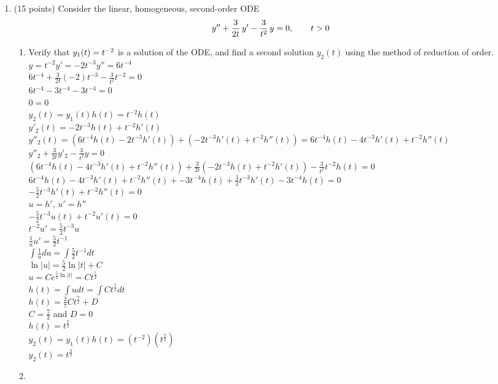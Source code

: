 \documentclass{article}
\begin{document}
\begin{enumerate}

\bigskip
\item (15 points) Consider the linear, homogeneous, second-order ODE
\[
y\sp{\prime\prime}+{3\over2t}\,y\sp\prime-{3\over t\sp2}\,y=0,\qquad t>0
\]
\begin{enumerate}
\item
Verify that $y_1(t)=t\sp{-2}$ is a solution of the ODE, and find a second solution $y_2(t)$ using the method of reduction of order.
\\$y=t^{-2}$\qquad$y'=-2t^{-3}$\qquad$y''=6t^{-4}$
\\$6t^{-4}+\frac{3}{2t}(-2)t^{-3}-\frac{3}{t^2}t^{-2}=0$
\\$6t^{-4}-3t^{-4}-3t^{-4}=0$
\\$0=0$
\\$y_2(t)=y_1(t)h(t)=t^{-2}h(t)$
\\$y'_2(t)=-2t^{-3}h(t)+t^{-2}h'(t)$
\\$y''_2(t)=(6t^{-4}h(t)-2t^{-3}h'(t))+(-2t^{-3}h'(t)+t^{-2}h''(t))=6t^{-4}h(t)-4t^{-3}h'(t)+t^{-2}h''(t)$
\\$y''_2+\frac{3}{2t}y'_2-\frac{3}{t^2}y=0$
\\$(6t^{-4}h(t)-4t^{-3}h'(t)+t^{-2}h''(t))+\frac{3}{2t}(-2t^{-3}h(t)+t^{-2}h'(t))-\frac{3}{t^2}t^{-2}h(t)=0$
\\$6t^{-4}h(t)-4t^{-3}h'(t)+t^{-2}h''(t)+-3t^{-4}h(t)+\frac{3}{2}t^{-3}h'(t)-3t^{-4}h(t)=0$
\\$-\frac{5}{2}t^{-3}h'(t)+t^{-2}h''(t)=0$
\\$u=h'$, $u'=h''$
\\$-\frac{5}{2}t^{-3}u(t)+t^{-2}u'(t)=0$
\\$t^{-2}u'=\frac{5}{2}t^{-3}u$
\\$\frac{1}{u}u'=\frac{5}{2}t^{-1}$
\\$\int\frac{1}{u}du=\int\frac{5}{2}t^{-1}dt$
\\$\ln|u|=\frac{5}{2}\ln|t|+C$
\\$u=Ce^{\frac{5}{2}\ln|t|}=Ct^{\frac{5}{2}}$
\\$h(t)=\int u dt=\int Ct^{\frac{5}{2}}dt$
\\$h(t)=\frac{2}{7}Ct^{\frac{7}{2}}+D$
\\$C=\frac{7}{2}$ and $D=0$
\\$h(t)=t^{\frac{7}{2}}$
\\$y_2(t)=y_1(t)h(t)=(t^{-2})(t^{\frac{7}{2}})$
\\$y_2(t)=t^{\frac{3}{2}}$
\item

\end{enumerate}
\end{enumerate}
\end{document}
